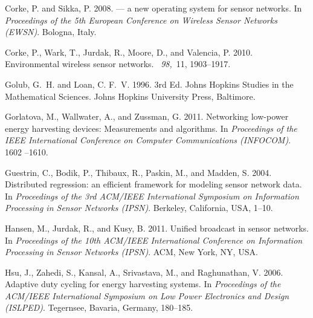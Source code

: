 \documentclass[prodmode,acmtosn]{acmsmall}
\begin{document}
\begin{thebibliography}{}
{\sc Corke, P.} {\sc and} {\sc Sikka, P.} 2008.
 --- a new operating system for sensor networks.
\newblock In {\em Proceedings of the 5th European Conference on Wireless Sensor
  Networks (EWSN)}. Bologna, Italy.

{\sc Corke, P.}, {\sc Wark, T.}, {\sc Jurdak, R.}, {\sc Moore, D.}, {\sc and}
  {\sc Valencia, P.} 2010.
\newblock Environmental wireless sensor networks.
~{\em 98,\/}~11, 1903--1917.

{\sc Golub, G.~H.} {\sc and} {\sc Loan, C. F.~V.} 1996.
 3rd Ed.
\newblock Johns Hopkins Studies in the Mathematical Sciences. Johns Hopkins
  University Press, Baltimore.

{\sc Gorlatova, M.}, {\sc Wallwater, A.}, {\sc and} {\sc Zussman, G.} 2011.
\newblock Networking low-power energy harvesting devices: Measurements and
  algorithms.
\newblock In {\em Proceedings of the IEEE International Conference on Computer
  Communications (INFOCOM)}. 1602 --1610.

{\sc Guestrin, C.}, {\sc Bodik, P.}, {\sc Thibaux, R.}, {\sc Paskin, M.}, {\sc
  and} {\sc Madden, S.} 2004.
\newblock Distributed regression: an efficient framework for modeling sensor
  network data.
\newblock In {\em Proceedings of the 3rd ACM/IEEE International Symposium on
  Information Processing in Sensor Networks (IPSN)}. Berkeley, California,
  {USA}, 1--10.

{\sc Hansen, M.}, {\sc Jurdak, R.}, {\sc and} {\sc Kusy, B.} 2011.
\newblock Unified broadcast in sensor networks.
\newblock In {\em Proceedings of the 10th ACM/IEEE International Conference on
  Information Processing in Sensor Networks (IPSN)}. ACM, New York, NY, USA.

{\sc Hsu, J.}, {\sc Zahedi, S.}, {\sc Kansal, A.}, {\sc Srivastava, M.}, {\sc
  and} {\sc Raghunathan, V.} 2006.
\newblock Adaptive duty cycling for energy harvesting systems.
\newblock In {\em Proceedings of the ACM/IEEE International Symposium on Low
  Power Electronics and Design (ISLPED)}. Tegernsee, Bavaria, Germany,
  180--185.


\end{thebibliography}
\end{document}
